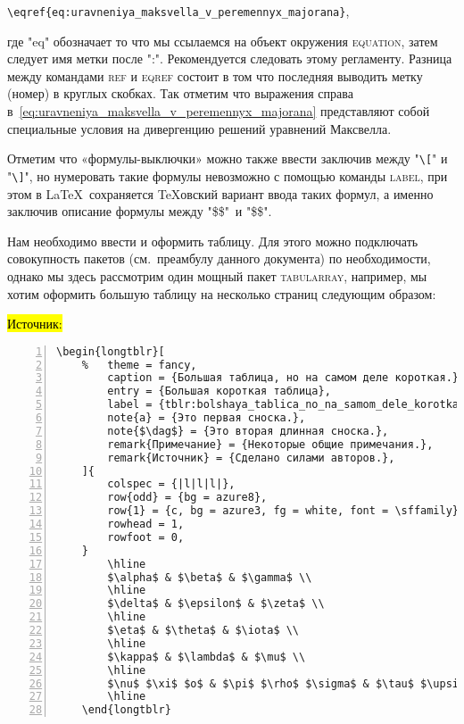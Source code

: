 \verb|\eqref{eq:uravneniya_maksvella_v_peremennyx_majorana}|,

\noindent где "eq" обозначает то что мы ссылаемся на объект окружения \textsc{equation}, затем следует имя метки после ":". Рекомендуется следовать этому регламенту. Разница между командами \textsc{ref} и \textsc{eqref} состоит в том что последняя выводить метку (номер) в круглых скобках. Так отметим что выражения справа в~\eqref{eq:uravneniya_maksvella_v_peremennyx_majorana} представляют собой специальные условия на дивергенцию решений уравнений Максвелла.

Отметим что «формулы-выключки» можно также ввести заключив между "\verb|\[|" и "\verb|\]|", но нумеровать такие формулы невозможно с помощью команды \textsc{label}, при этом в \LaTeX\ сохраняется \TeX овский вариант ввода таких формул, а именно заключив описание формулы между "\$\$"\ и "\$\$".

Нам необходимо ввести и оформить таблицу. Для этого можно подключать совокупность пакетов (см.~преамбулу данного документа) по необходимости, однако мы здесь рассмотрим один мощный пакет \textsc{tabularray}, например, мы хотим оформить большую таблицу на несколько страниц следующим образом:

\hl{Источник:}

\begin{Verbatim}[frame = single, label = {Пример окружения \textsc{longtblr}}, fontfamily = courier, tabsize = 3, numbers = left, gobble=1]
	\begin{longtblr}[
	% 	theme = fancy,
		caption = {Большая таблица, но на самом деле короткая.},
		entry = {Большая короткая таблица},
		label = {tblr:bolshaya_tablica_no_na_samom_dele_korotkaya},
		note{a} = {Это первая сноска.},
		note{$\dag$} = {Это вторая длинная сноска.},
		remark{Примечание} = {Некоторые общие примечания.},
		remark{Источник} = {Сделано силами авторов.},
	]{
		colspec = {|l|l|l|},
		row{odd} = {bg = azure8},
		row{1} = {c, bg = azure3, fg = white, font = \sffamily},
		rowhead = 1,
		rowfoot = 0,
	}
		\hline
		$\alpha$ & $\beta$ & $\gamma$ \\
		\hline
		$\delta$ & $\epsilon$ & $\zeta$ \\
		\hline
		$\eta$ & $\theta$ & $\iota$ \\
		\hline
		$\kappa$ & $\lambda$ & $\mu$ \\
		\hline
		$\nu$ $\xi$ $o$ & $\pi$ $\rho$ $\sigma$ & $\tau$ $\upsilon$ $\phi$ \\
		\hline
	\end{longtblr}
\end{Verbatim}

